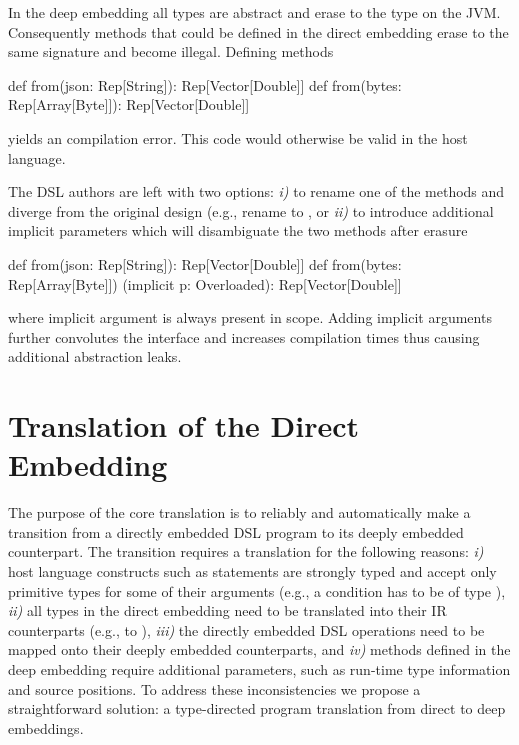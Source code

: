 In the deep embedding all types are abstract and erase to the type 
 on the JVM. Consequently methods that could be defined in the direct embedding
 erase to the same signature and become illegal. Defining methods \begin{lstparagraph}
def from(json: Rep[String]): Rep[Vector[Double]]
def from(bytes: Rep[Array[Byte]]): Rep[Vector[Double]]
 \end{lstparagraph} yields an compilation error. This code would otherwise be valid
in the host language.

The DSL authors are left with two options: \emph{i)} to rename one of the methods and diverge from the original design (e.g., rename  to , or \emph{ii)} to introduce additional implicit parameters which will disambiguate the two methods after erasure \begin{lstparagraph}
 def from(json: Rep[String]): Rep[Vector[Double]]
 def from(bytes: Rep[Array[Byte]])
   (implicit p: Overloaded): Rep[Vector[Double]]
\end{lstparagraph}
where implicit argument  is always present in scope. Adding implicit arguments
further convolutes the interface and increases compilation times thus causing additional
abstraction leaks.




\chapter{Translation of the Direct Embedding}
\label{sec:translation}

The purpose of the core \yy translation is to reliably and automatically make
a transition from a directly embedded DSL program to its deeply embedded
counterpart. The transition requires a translation for the following reasons:
\emph{i)} host language constructs such as  statements are strongly
typed and accept only primitive types for some of their arguments (e.g., a
condition has to be of type ), \emph{ii)} all types in the direct
embedding need to be translated into their IR counterparts (e.g.,  to
), \emph{iii)} the directly embedded DSL operations need to be
mapped onto their deeply embedded counterparts, and \emph{iv)} methods defined
in the deep embedding require additional parameters, such as run-time type
information and source positions. To address these inconsistencies we propose a
straightforward solution: a type-directed program translation from direct to
deep embeddings.

